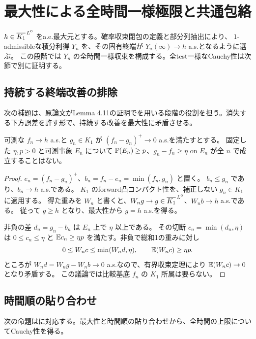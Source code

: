 \section{最大性による全時間一様極限と共通包絡}
\label{sec:selection}
$h\in\overline{K_1}^{\,L^0}$ をa.e.最大元とする。確率収束閉包の定義と部分列抽出により、
$1$-admissibleな積分利得 $Y_n$ を、その固有終端が $Y_n(\infty)\to h$ a.s.となるように選ぶ。
この段階では $Y_n$ の全時間一様収束を構成する。全test一様なCauchy性は次節で別に証明する。

\subsection{持続する終端改善の排除}
次の補題は、原論文がLemma 4.11の証明で\cite[Lemma A3.1]{DS}を用いる段階の役割を担う。消失する下方誤差を許す形で、持続する改善を最大性に矛盾させる。

\begin{lemma}[消失する下方誤差と最大性]\label{lem:persistent-improvement}
可測な $f_n\to h$ a.s.と $g_n\in K_1$ が
$(f_n-g_n)^+\to0$ a.s.を満たすとする。
固定した $\eta,p>0$ と可測事象 $E_n$ について
$\mathbb P(E_n)\geq p$、$g_n-f_n\geq\eta$ on $E_n$ が全 $n$ で成立することはない。
\end{lemma}
\begin{proof}
$e_n=(f_n-g_n)^+$、$b_n=f_n-e_n=\min(f_n,g_n)$ と置く。
$b_n\leq g_n$ であり、$b_n\to h$ a.s.である。
$K_1$ のforward凸コンパクト性を、補正しない $g_n\in K_1$ に適用する。
得た重みを $W_n$ と書くと、$W_ng\to g\in\overline{K_1}^{\,L^0}$、$W_nb\to h$ a.s.である。
従って $g\geq h$ となり、最大性から $g=h$ a.s.を得る。

非負の差 $d_n=g_n-b_n$ は $E_n$ 上で $\eta$ 以上である。
その切断 $c_n=\min(d_n,\eta)$ は $0\leq c_n\leq\eta$ と
$\mathbb E c_n\geq\eta p$ を満たす。非負で総和1の重みに対し
\[
 0\leq W_nc\leq\min(W_nd,\eta),\qquad \mathbb E(W_nc)\geq\eta p.
\]
ところが $W_nd=W_ng-W_nb\to0$ a.s.なので、有界収束定理により
$\mathbb E(W_nc)\to0$ となり矛盾する。
この議論では比較基底 $f_n$ の $K_1$ 所属は要らない。
\end{proof}

\subsection{時間順の貼り合わせ}
次の命題は\cite[Lemma 4.5]{DS}に対応する。最大性と時間順の貼り合わせから、全時間の上限についてCauchy性を得る。

